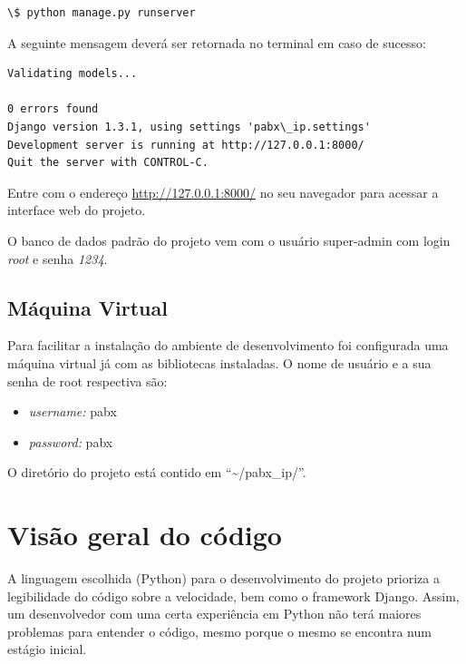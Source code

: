 \documentclass[letterpaper,10pt,brazil]{sphinxmanual}
\begin{document}
\begin{Verbatim}[commandchars=\\\{\}]
\$ python manage.py runserver
\end{Verbatim}

A seguinte mensagem deverá ser retornada no terminal em caso de sucesso:

\begin{Verbatim}[commandchars=\\\{\}]
Validating models...

0 errors found
Django version 1.3.1, using settings 'pabx\_ip.settings'
Development server is running at http://127.0.0.1:8000/
Quit the server with CONTROL-C.
\end{Verbatim}

Entre com o endereço \href{http://127.0.0.1:8000/}{http://127.0.0.1:8000/} no seu navegador para acessar a interface web do projeto.

O banco de dados padrão do projeto vem com o usuário super-admin com login \emph{root} e senha \emph{1234}.


\subsection{Máquina Virtual}
\label{inicio:maquina-virtual}
Para facilitar a instalação do ambiente de desenvolvimento foi configurada uma máquina virtual já com as bibliotecas instaladas. O nome de usuário e a sua senha de root respectiva são:
\begin{itemize}
\item {} 
\emph{username:} pabx

\item {} 
\emph{password:} pabx

\end{itemize}

O diretório do projeto está contido em ``\textasciitilde{}/pabx\_ip/''.


\section{Visão geral do código}
\label{codigo::doc}\label{codigo:visao-geral-do-codigo}
A linguagem escolhida (Python) para o desenvolvimento do projeto prioriza a legibilidade do código sobre a velocidade, bem como o framework Django. Assim, um desenvolvedor com uma certa experiência em Python não terá maiores problemas para entender o código, mesmo porque o mesmo se encontra num estágio inicial.
\end{document}
